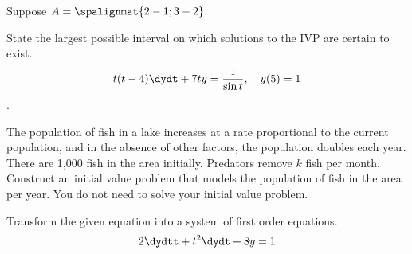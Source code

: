 \documentclass[12pt]{exam}
\begin{document}
\begin{questions}
    \newpage
    \question[10] Suppose $A = \spalignmat{2 -1;3 -2}.$  
 	
    
    \newpage
    
    \question[2] %
    State the largest possible interval on which solutions to the IVP are certain to exist. $$t(t-4) \dydt + 7t y = \frac{1}{\sin t}, \quad y(5) = 1$$.    \vspace{3cm}
    
    \question[3] %
    The population of fish in a lake increases at a rate proportional to the current population, and in the absence of other factors, the population doubles each year. There are 1,000 fish in the area initially. Predators remove $k$ fish per month. Construct an initial value problem that models the population of fish in the area per year. You do not need to solve your initial value problem. 
    \vspace{4cm}
    
    \question[3] %
    Transform the given equation into a system of first order equations. 
    $$2\dydtt + t^2\dydt +8y = 1$$
    

\end{questions}
\end{document}

